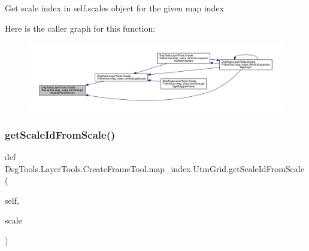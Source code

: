 \begin{DoxyVerb}Get scale index in self.scales object for the given map index
\end{DoxyVerb}
 Here is the caller graph for this function\+:
\nopagebreak
\begin{figure}[H]
\begin{center}
\leavevmode
\includegraphics[width=350pt]{class_dsg_tools_1_1_layer_tools_1_1_create_frame_tool_1_1map__index_1_1_utm_grid_ac2da63f852d93d4540cb483662ce48e6_icgraph}
\end{center}
\end{figure}
\mbox{\label{class_dsg_tools_1_1_layer_tools_1_1_create_frame_tool_1_1map__index_1_1_utm_grid_af41076b4415ef2d1ad434f4a9f73ca1f}} 
\subsubsection{\texorpdfstring{get\+Scale\+Id\+From\+Scale()}{getScaleIdFromScale()}}
{\footnotesize\ttfamily def Dsg\+Tools.\+Layer\+Tools.\+Create\+Frame\+Tool.\+map\+\_\+index.\+Utm\+Grid.\+get\+Scale\+Id\+From\+Scale (\begin{DoxyParamCaption}\item[{}]{self,  }\item[{}]{scale }\end{DoxyParamCaption})}

